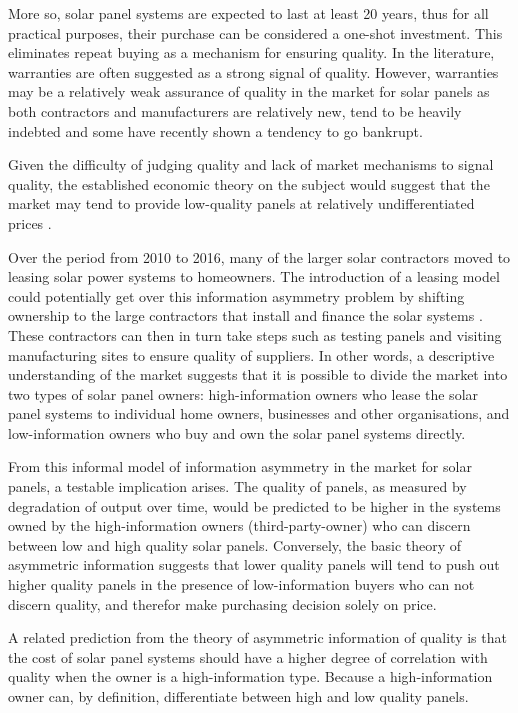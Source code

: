 \documentclass[12pt]{article}
\begin{document}
More so, solar panel systems are expected to last at least 20 years, thus for all practical purposes, their purchase can be considered a one-shot investment. This eliminates repeat buying as a mechanism for ensuring quality. In the literature, warranties are often suggested as a strong signal of quality. However, warranties may be a relatively weak assurance of quality in the market for solar panels as both contractors and manufacturers are relatively new, tend to be heavily indebted and some have recently shown a tendency to go bankrupt.

Given the difficulty of judging quality and lack of market mechanisms to signal quality, the established economic theory on the subject would suggest that the market may tend to provide low-quality panels at relatively undifferentiated prices \citep{tirole_theory_1988}.

Over the period from 2010 to 2016, many of the larger solar contractors moved to leasing solar power systems to homeowners. The introduction of a leasing model could potentially get over this information asymmetry problem by shifting ownership to the large contractors that install and finance the solar systems \citep{mauritzen_cost_2017}. These contractors can then in turn take steps such as testing panels and visiting manufacturing sites to ensure quality of suppliers. In other words, a descriptive understanding of the market suggests that it is possible to divide the market into two types of solar panel owners: high-information owners who lease the solar panel systems to individual home owners, businesses and other organisations, and low-information owners who buy and own the solar panel systems directly.

From this informal model of information asymmetry in the market for solar panels, a testable implication arises. The quality of panels, as measured by degradation of output over time, would be predicted to be higher in the systems owned by the high-information owners (third-party-owner) who can discern between low and high quality solar panels. Conversely, the basic theory of asymmetric information suggests that lower quality panels will tend to push out higher quality panels in the presence of low-information buyers who can not discern quality, and therefor make purchasing decision solely on price.

A related prediction from the theory of asymmetric information of quality is that the cost of solar panel systems should have a higher degree of correlation with quality when the owner is a high-information type. Because a high-information owner can, by definition, differentiate between high and low quality panels.
\end{document}
